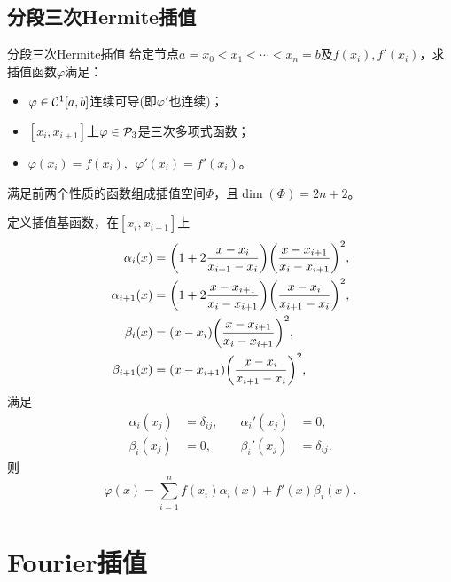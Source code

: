 \subsection{分段三次Hermite插值}

\begin{definition}
    {分段三次Hermite插值}{}
    给定节点$a=x_0<x_1<\cdots<x_n=b$及$f(x_i),f'(x_i)$，求插值函数$\varphi$满足：
    \begin{itemize}
        \item $\varphi\in\mathcal C^1[a,b]$连续可导(即$\varphi'$也连续)；
        \item $[x_i,x_{i+1}]$上$\varphi\in\mathcal P_3$是三次多项式函数；
        \item $\varphi(x_i)=f(x_i),\enspace\varphi'(x_i)=f'(x_i)$。
    \end{itemize}
    满足前两个性质的函数组成插值空间$\Phi$，且$\dim(\Phi)=2n+2$。
\end{definition}

定义插值基函数，在$[x_i,x_{i+1}]$上
\begin{subequations}
    \begin{align}
        \alpha_i(x)&=\biggl(1+2\frac{x-x_i}{x_{i+1}-x_i}\biggr)\biggl(\frac{x-x_{i+1}}{x_i-x_{i+1}}\biggr)^2,\\
        \alpha_{i+1}(x)&=\biggl(1+2\frac{x-x_{i+1}}{x_i-x_{i+1}}\biggr)\biggl(\frac{x-x_i}{x_{i+1}-x_i}\biggr)^2,\\
        \beta_i(x)&=(x-x_i)\biggl(\frac{x-x_{i+1}}{x_i-x_{i+1}}\biggr)^2,\\
        \beta_{i+1}(x)&=(x-x_{i+1})\biggl(\frac{x-x_i}{x_{i+1}-x_i}\biggr)^2,
    \end{align}
\end{subequations}
满足
\begin{subequations}
    \begin{alignat}{2}
        \alpha_i(x_j)&=\delta_{ij},\quad&\alpha_i'(x_j)&=0,\\
        \beta_i(x_j)&=0,&\beta_i'(x_j)&=\delta_{ij}.
    \end{alignat}
\end{subequations}
则
\begin{equation}
    \varphi(x)=\sum_{i=1}^nf(x_i)\alpha_i(x)+f'(x)\beta_i(x).
\end{equation}

\section{Fourier插值}
\label{sec:Fourier interpolation}

